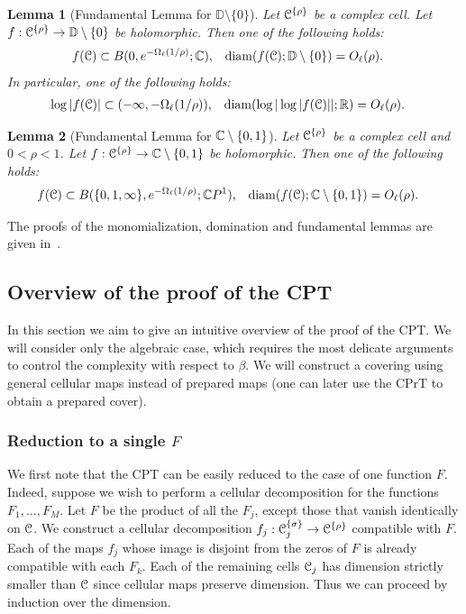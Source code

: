 \documentclass[reqno]{amsart}
\newtheorem*{Lem*}{Lemma}{\bfseries}{\itshape}
\renewcommand\~[1]{\widetilde{#1}}
\def\diam{\operatorname{diam}} \def\ord{\operatorname{ord}}
\def\D{{\mathbb D}}
\def\he#1{{\{#1\}}}
\def\hrho{{\he\rho}}
\def\hsigma{{\he\sigma}}
\begin{document}
\begin{Lem*}[Fundamental Lemma for $\D\setminus\{0\}$]
  Let $\cC^\hrho$ be a complex cell. Let
  $f:\cC^\hrho\to\D\setminus\{0\}$ be holomorphic. Then one of the
  following holds:
  \begin{align}
    f(\cC)&\subset B(0,e^{-\Omega_\ell(1/\rho)};\C), & \diam(f(\cC);\D\setminus\{0\})&=O_\ell(\rho).
  \end{align}
  In particular, one of the following holds:
  \begin{align}
    \log |f(\cC)| &\subset (-\infty,-\Omega_\ell(1/\rho)), & \diam(\log|\log|f(\cC)||;\R)&=O_\ell(\rho).
  \end{align}
\end{Lem*}

\begin{Lem*}[Fundamental Lemma for ${\mathbb C}\setminus\{0,1\}$]
  Let $\cC^\hrho$ be a complex cell and $0<\rho<1$. Let
  $f:\cC^\hrho\to\C\setminus\{0,1\}$ be holomorphic. Then one
  of the following holds:
  \begin{align}
    f(\cC)&\subset B(\{0,1,\infty\},e^{-\Omega_\ell(1/\rho)};\C P^1), & \diam(f(\cC);\C\setminus\{0,1\})&=O_\ell(\rho).
  \end{align}
\end{Lem*}

The proofs of the monomialization, domination and fundamental lemmas
are given in~. 


\subsection{Overview of the proof of the CPT}

In this section we aim to give an intuitive overview of the proof of
the CPT. We will consider only the algebraic case, which requires the
most delicate arguments to control the complexity with respect to
$\beta$. We will construct a covering using general cellular maps
instead of prepared maps (one can later use the CPrT to obtain a
prepared cover).

\subsubsection{Reduction to a single $F$}

We first note that the CPT can be easily reduced to the case of one
function $F$. Indeed, suppose we wish to perform a cellular
decomposition for the functions $F_1,\ldots,F_M$. Let $F$ be the
product of all the $F_j$, except those that vanish identically on
${\mathcal C}$. We construct a cellular decomposition
$f_j:\cC_j^\hsigma\to\cC^\hrho$ compatible with $F$. Each of the maps
$f_j$ whose image is disjoint from the zeros of $F$ is already
compatible with each $F_k$. Each of the remaining cells ${\mathcal C}_j$ has
dimension strictly smaller than ${\mathcal C}$ since cellular maps preserve
dimension. Thus we can proceed by induction over the dimension.
\end{document}
